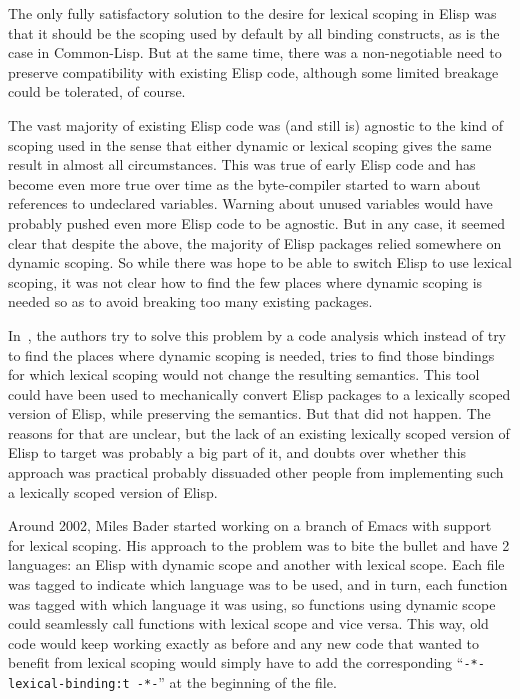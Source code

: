 \documentclass[format=acmsmall, review=false, screen=true]{acmart}
\newcommand \Elisp {Elisp}
\begin{document}
The only fully satisfactory solution to the desire for lexical scoping in
\Elisp{} was that it should be the scoping used by default by all binding
constructs, as is the case in Common-Lisp.  But at the same time, there was
a non-negotiable need to preserve compatibility with existing \Elisp{} code,
although some limited breakage could be tolerated, of course.

The vast majority of existing \Elisp{} code was (and still is) agnostic to
the kind of scoping used in the sense that either dynamic or lexical scoping
gives the same result in almost all circumstances.  This was true of early
\Elisp{} code and has become even more true over time as the byte-compiler
started to warn about references to undeclared variables.  Warning about
unused variables would have probably pushed even more \Elisp{} code to be
agnostic.  But in any case, it seemed clear that despite the above, the
majority of Elisp packages relied somewhere on dynamic scoping.  So while
there was hope to be able to switch \Elisp{} to use lexical scoping, it was
not clear how to find the few places where dynamic scoping is needed so as
to avoid breaking too many existing packages.

In~\cite{Neubauer01}, the authors try to solve this problem by a code
analysis which instead of try to find the places where dynamic scoping is
needed, tries to find those bindings for which lexical scoping would not
change the resulting semantics.  This tool could have been used to
mechanically convert \Elisp{} packages to a lexically scoped version of
\Elisp{}, while preserving the semantics.  But that did not happen.
The reasons for that are unclear, but the lack of an existing lexically
scoped version of \Elisp{} to target was probably a big part of it, and
doubts over whether this approach was practical probably dissuaded other
people from implementing such a lexically scoped version of \Elisp{}.

Around 2002, Miles Bader started working on a branch of Emacs with support
for lexical scoping.  His approach to the problem was to bite the bullet and
have 2 languages: an \Elisp{} with dynamic scope and another with lexical
scope.  Each file was tagged to indicate which language was to be used, and
in turn, each function was tagged with which language it was using, so
functions using dynamic scope could seamlessly call functions with lexical
scope and vice versa.  This way, old code would keep working exactly as
before and any new code that wanted to benefit from lexical scoping would
simply have to add the corresponding ``\texttt{-*- lexical-binding:t -*-}''
at the beginning of the file.
\end{document}
